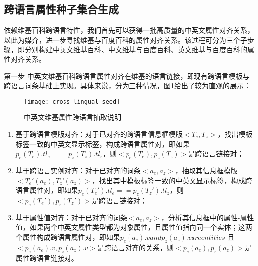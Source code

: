 \subsection{跨语言属性种子集合生成}
\label{sec:cross-lingual-seed}
依赖维基百科跨语言特性，我们首先可以获得一批高质量的中英文属性对齐关系，以此为媒介，进一步寻找维基与百度百科的属性对齐关系。该过程可分为三个子步骤，即分别构建中英文维基百科、中文维基与百度百科、英文维基与百度百科的属性对齐关系。

{\heiti 第一步 中英文维基百科跨语言属性对齐}在维基的语言链接，即现有跨语言模板与跨语言词条基础上实现。具体来说，分为三种情况，图\ref{fig:cross-lingual-seed}给出了较为直观的展示：

\begin{figure}[h]
  \centering
    \texttt{[image: cross-lingual-seed]}
  \caption{中英文维基属性跨语言抽取说明}
  \label{fig:cross-lingual-seed}
\end{figure}

\begin{enumerate}[1)]
\item  {\heiti 基于跨语言模版对齐：}对于已对齐的跨语言信息框模版$<T_e, T_z>$，找出模板标签一致的中英文显示标签，构成跨语言属性对，即如果$p_e(T_e).tl_e == p_z(T_z).tl_z$，则$<p_e(T_e), p_z(T_z)>$是跨语言链接对；
\item  {\heiti 基于跨语言实例对齐：}对于已对齐的词条$<a_e, a_z>$，抽取其信息框模版$<T_e'(a_e), T_z'(a_z)>$，找出其中模板标签一致的中英文显示标签，构成跨语言属性对，即如果$p_e(T_e').tl_e == p_z(T_z').tl_z$，则$<p_e(T_e'), p_z(T_z')>$是跨语言链接对；
\item  {\heiti 基于属性值对齐：}对于已对齐的词条$<a_e, a_z>$，分析其信息框中的属性-属性值，如果两个中英文属性类型都为对象属性，且属性值指向同一个实体；这两个属性构成跨语言属性对，即如果$p_e(a_e).v and p_z(a_z).v are entities$ 且 $<p_e(a_e).v, p_z(a_z).v>$是跨语言对齐的关系，则$<p_e(a_e), p_z(a_z)>$是属性跨语言链接对。
\end{enumerate}

